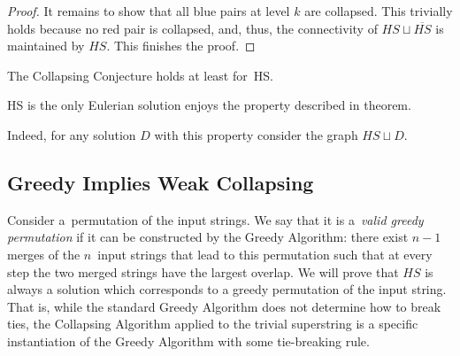 \begin{proof}
It remains to show that all blue pairs at level $k$ are collapsed. This trivially holds because no red pair is collapsed, and, thus, the connectivity of $HS \sqcup \overline{HS}$ is maintained by $HS$. This finishes the proof.
\end{proof}
\begin{corollary}
    The Collapsing Conjecture holds at least for~HS.
\end{corollary}
\begin{corollary}
    HS is the only Eulerian solution enjoys the property described in theorem.
\end{corollary}
Indeed, for any solution $D$ with this property consider the graph $HS \sqcup D$.

\subsection{Greedy Implies Weak Collapsing}
\label{sec:gr_im_wcc}
Consider a~permutation of the input strings. We say that it is a~{\em valid greedy permutation} if it can be constructed by the Greedy Algorithm: there exist $n-1$ merges of the $n$~input strings that lead to this permutation such that at every step the two merged strings have the largest overlap. We will prove that $HS$ is always a solution which corresponds to a greedy permutation of the input string. That is, while the standard Greedy Algorithm does not determine how to break ties, the Collapsing Algorithm applied to the trivial superstring is a specific instantiation of the Greedy Algorithm with some tie-breaking rule.

